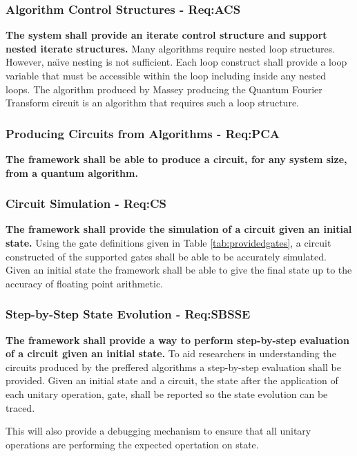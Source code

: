 \subsubsection{Algorithm Control Structures - Req:ACS}
\label{sec:reqacs}
\textbf{The system shall provide an iterate control structure and support nested iterate structures.}
Many algorithms require nested loop structures.
However, na\"{\i}ve nesting is not sufficient.
Each loop construct shall provide a loop variable that must be accessible within the loop including inside any nested loops.
The algorithm produced by Massey\cite{masseythesis} producing the Quantum Fourier Transform circuit is an algorithm that requires such a loop structure.

\subsubsection{Producing Circuits from Algorithms - Req:PCA}
\label{sec:reqpca}
\textbf{The framework shall be able to produce a circuit, for any system size, from a quantum algorithm.}

\subsubsection{Circuit Simulation - Req:CS}
\label{sec:reqcs}
\textbf{The framework shall provide the simulation of a circuit given an initial state.}
Using the gate definitions given in Table \ref{tab:providedgates}, a circuit constructed of the supported gates shall be able to be accurately simulated.
Given an initial state the framework shall be able to give the final state up to the accuracy of floating point arithmetic.

\subsubsection{Step-by-Step State Evolution - Req:SBSSE}
\label{sec:reqsbsse}
\textbf{The framework shall provide a way to perform step-by-step evaluation of a circuit given an initial state.}
To aid researchers in understanding the circuits produced by the preffered algorithms a step-by-step evaluation shall be provided.
Given an initial state and a circuit, the state after the application of each unitary operation, gate, shall be reported so the state evolution can be traced.

This will also provide a debugging mechanism to ensure that all unitary operations are performing the expected opertation on state.

